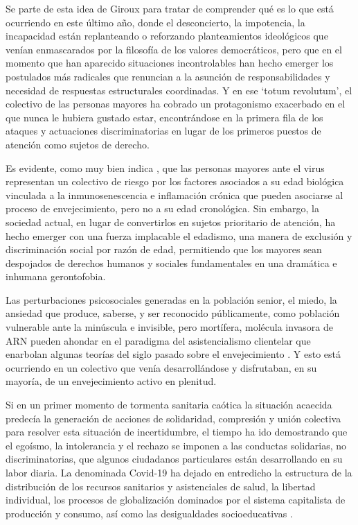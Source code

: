 \documentclass[spanish]{textolivre}
\begin{document}
Se parte de esta idea de Giroux para tratar de comprender qué es lo que está ocurriendo en este último año, donde el desconcierto, la impotencia, la incapacidad están replanteando o reforzando planteamientos ideológicos que venían enmascarados por la filosofía de los valores democráticos, pero que en el momento que han aparecido situaciones incontrolables han hecho emerger los postulados más radicales que renuncian a la asunción de responsabilidades y necesidad de respuestas estructurales coordinadas. Y en ese ‘totum revolutum’, el colectivo de las personas mayores ha cobrado un protagonismo exacerbado en el que nunca le hubiera gustado estar, encontrándose en la primera fila de los ataques y actuaciones discriminatorias en lugar de los primeros puestos de atención como sujetos de derecho.

Es evidente, como muy bien indica \textcite{pinazo2020}, %
que las personas mayores ante el virus representan un colectivo de riesgo por los factores asociados a su edad biológica vinculada a la inmunosenescencia e inflamación crónica que pueden asociarse al proceso de envejecimiento, pero no a su edad cronológica. Sin embargo, la sociedad actual, en lugar de convertirlos en sujetos prioritario de atención, ha hecho emerger con una fuerza implacable el edadismo, una manera de exclusión y discriminación social por razón de edad, permitiendo que los mayores sean despojados de derechos humanos y sociales fundamentales en una dramática e inhumana gerontofobia.

Las perturbaciones psicosociales generadas en la población senior, el miedo, la ansiedad que produce, saberse, y ser reconocido públicamente, como población vulnerable ante la minúscula e invisible, pero mortífera, molécula invasora de ARN \cite{remuzzi2020} %
pueden ahondar en el paradigma del asistencialismo clientelar que enarbolan algunas teorías del siglo pasado sobre el envejecimiento \cite{fernandezballasteros2000}. %
Y esto está ocurriendo en un colectivo que venía desarrollándose y disfrutaban, en su mayoría, de un envejecimiento activo en plenitud.

Si en un primer momento de tormenta sanitaria caótica la situación acaecida predecía la generación de acciones de solidaridad, compresión y unión colectiva para resolver esta situación de incertidumbre, el tiempo ha ido demostrando que el egoísmo, la intolerancia y el rechazo se imponen a las conductas solidarias, no discriminatorias, que algunos ciudadanos particulares están desarrollando en su labor diaria. La denominada Covid-19 ha dejado en entredicho la estructura de la distribución de los recursos sanitarios y asistenciales de salud, la libertad individual, los procesos de globalización dominados por el sistema capitalista de producción y consumo, así como las desigualdades socioeducativas \cite{caceres-munoz2020}. %
\end{document}
